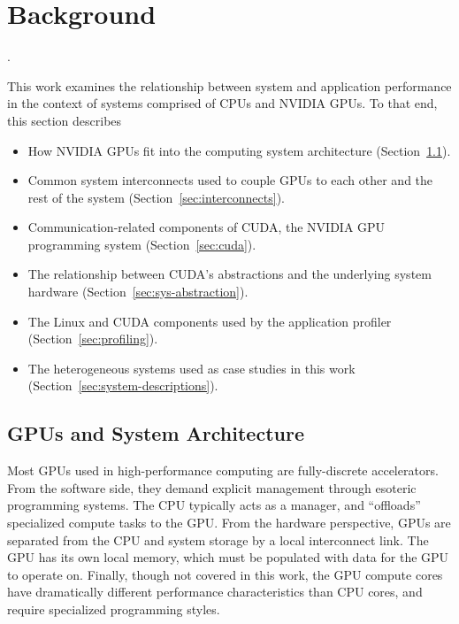 \chapter{Background}
\label{ch:background}

.

This work examines the relationship between system and application performance in the context of systems comprised of CPUs and NVIDIA GPUs.
To that end, this section describes
\begin{itemize}
\item How NVIDIA GPUs fit into the computing system architecture (Section~\ref{sec:gpu-sys-arch}).
\item Common system interconnects used to couple GPUs to each other and the rest of the system (Section~\ref{sec:interconnects}).
\item Communication-related components of CUDA, the NVIDIA GPU programming system (Section~\ref{sec:cuda}).
\item The relationship between CUDA's abstractions and the underlying system hardware (Section~\ref{sec:sys-abstraction}).
\item The Linux and CUDA components used by the application profiler (Section~\ref{sec:profiling}).
\item The heterogeneous systems used as case studies in this work (Section~\ref{sec:system-descriptions}).
\end{itemize}

\section{GPUs and System Architecture}
\label{sec:gpu-sys-arch}

Most GPUs used in high-performance computing are fully-discrete accelerators.
From the software side, they demand explicit management through esoteric programming systems.
The CPU typically acts as a manager,  and ``offloads'' specialized compute tasks to the GPU.
From the hardware perspective, GPUs are separated from the CPU and system storage by a local interconnect link.
The GPU has its own local memory, which must be populated with data for the GPU to operate on.
Finally, though not covered in this work, the GPU compute cores have dramatically different performance characteristics than CPU cores, and require specialized programming styles.


